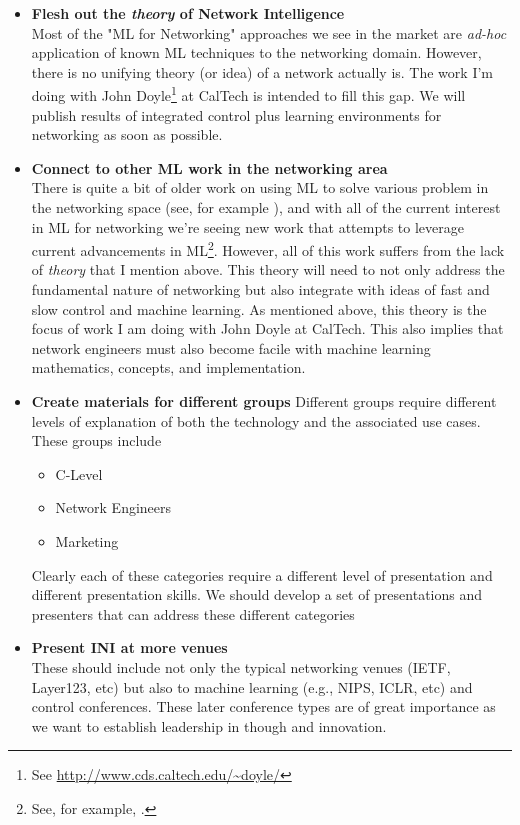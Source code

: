 \documentclass[11pt, oneside]{article}   	%
\begin{document}
\begin{itemize}
\item \textbf{Flesh out the \emph{theory} of Network Intelligence} \\
Most of the "ML for Networking" approaches we see in the market are \emph{ad-hoc} application of known ML techniques to the networking domain. However, there is no unifying theory (or idea) of a network actually is. The work I'm doing with John Doyle\footnote{See \url{http://www.cds.caltech.edu/~doyle/}} at CalTech is intended to fill this gap. We will publish results of integrated control plus learning environments for networking as soon as possible.


\item \textbf{Connect to other ML work in the networking area} \\
There is quite a bit of older work on using ML to solve various problem in the networking space (see, for example  \cite{Tao:2001aa}), 
and with all of the current interest in ML for networking we're seeing new work that attempts to leverage current advancements 
in ML\footnote{See, for example, \cite{Stampa:2017aa}.}.  However, all of this work suffers from the lack of \emph{theory} that I mention above. This theory will need to not only address the fundamental nature of networking but also integrate with ideas of fast and slow control and machine learning. As mentioned above, this theory is the focus of work I am doing with John Doyle at CalTech. This also implies that network engineers must also become facile with machine learning mathematics, concepts, and
implementation.

\item \textbf{Create materials for different groups} 
Different groups require different levels of explanation of both the technology and the associated use cases. These groups include
\begin{itemize}
\item{C-Level}
\item{Network Engineers}
\item{Marketing}
\end{itemize}
Clearly each of these categories require a different level of presentation and different presentation skills. We should develop a set of presentations and presenters that can
address these different categories

\item \textbf{Present INI at more venues} \\
These should include not only the typical networking venues (IETF, Layer123, etc) but also to machine learning (e.g., NIPS, ICLR, etc)  and control conferences. These later conference types are of great 
importance as we want to establish leadership in though and innovation.


\end{itemize}
\end{document}
